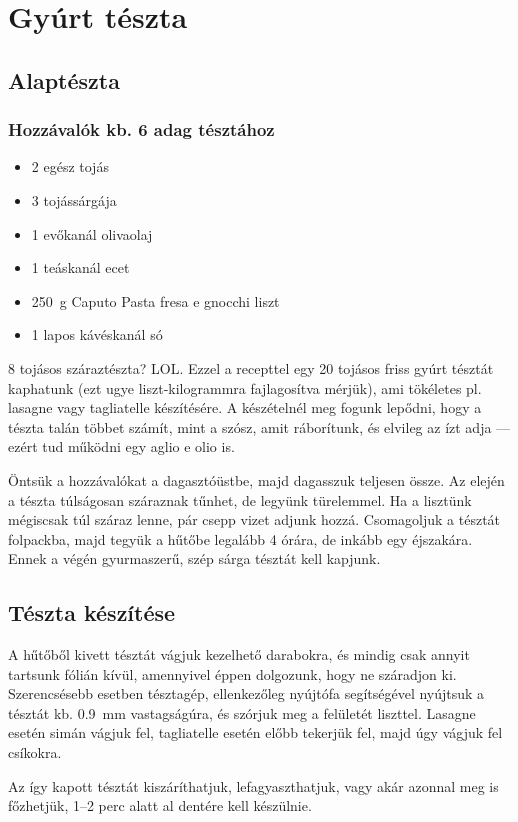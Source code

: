 \newpage
\section{Gyúrt tészta} \label{sec:gyurt-teszta}

\subsection*{Alaptészta}
\subsubsection*{Hozzávalók kb. 6 adag tésztához}
\begin{itemize}
    \item \num{2} egész tojás
    \item \num{3} tojássárgája
    \item \num{1} evőkanál olivaolaj
    \item \num{1} teáskanál ecet
    \item \qty{250}{\g} Caputo Pasta fresa e gnocchi liszt
    \item \num{1} lapos kávéskanál só
\end{itemize}

\num{8} tojásos száraztészta? LOL. Ezzel a recepttel egy \num{20} tojásos friss gyúrt tésztát kaphatunk (ezt ugye liszt-kilogrammra fajlagosítva mérjük), ami tökéletes pl. lasagne vagy tagliatelle készítésére. A készételnél meg fogunk lepődni, hogy a tészta talán többet számít, mint a szósz, amit ráborítunk, és elvileg az ízt adja --- ezért tud működni egy aglio e olio is.

Öntsük a hozzávalókat a dagasztóüstbe, majd dagasszuk teljesen össze. Az elején a tészta túlságosan száraznak tűnhet, de legyünk türelemmel. Ha a lisztünk mégiscsak túl száraz lenne, pár csepp vizet adjunk hozzá. Csomagoljuk a tésztát folpackba, majd tegyük a hűtőbe legalább \num{4} órára, de inkább egy éjszakára. Ennek a végén gyurmaszerű, szép sárga tésztát kell kapjunk.~\cite{szell_gyurt_teszta}

\subsection*{Tészta készítése}
A hűtőből kivett tésztát vágjuk kezelhető darabokra, és mindig csak annyit tartsunk fólián kívül, amennyivel éppen dolgozunk, hogy ne száradjon ki. Szerencsésebb esetben tésztagép, ellenkezőleg nyújtófa segítségével nyújtsuk a tésztát kb. \qty{0.9}{\mm} vastagságúra, és szórjuk meg a felületét liszttel. Lasagne esetén simán vágjuk fel, tagliatelle esetén előbb tekerjük fel, majd úgy vágjuk fel csíkokra.

Az így kapott tésztát kiszáríthatjuk, lefagyaszthatjuk, vagy akár azonnal meg is főzhetjük, \numrange{1}{2} perc alatt al dentére kell készülnie.
